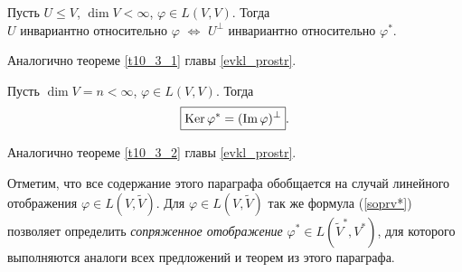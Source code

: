 \begin{theor}\label{t8_9_1} 
Пусть $U\leq V$, $\dim V <\infty$, $\varphi \in L(V, V)$. Тогда  \\
$U$ инвариантно относительно $\varphi$ 
$\Leftrightarrow$ 
$U^{\bot}$ инвариантно относительно $\varphi ^{*}$.
\end{theor}
\dok 
Аналогично теореме \ref{t10_3_1} главы \ref{evkl_prostr}.
\edok

\begin{theor}\label{t8_9_2} 
Пусть $\dim V=n <\infty$, $\varphi \in L(V, V)$. Тогда  \\
$$\boxed{\mathop{\rm Ker}\nolimits \varphi ^{*} = (\mathop{\rm Im}\nolimits \varphi)^{\bot }}.$$
\end{theor}
\dok  
Аналогично теореме \ref{t10_3_2} главы \ref{evkl_prostr}.
\edok


\otstup
Отметим, что все содержание этого параграфа обобщается на случай 
линейного отображения $\varphi \in L(V, \widetilde{V})$.
Для $\varphi \in L(V, \widetilde{V})$ так же формула (\ref{soprv*}) позволяет
определить {\it сопряженное отображение} $\varphi^* \in L(\widetilde{V}^*, V^*)$,
для которого выполняются аналоги всех предложений и теорем из этого параграфа.
